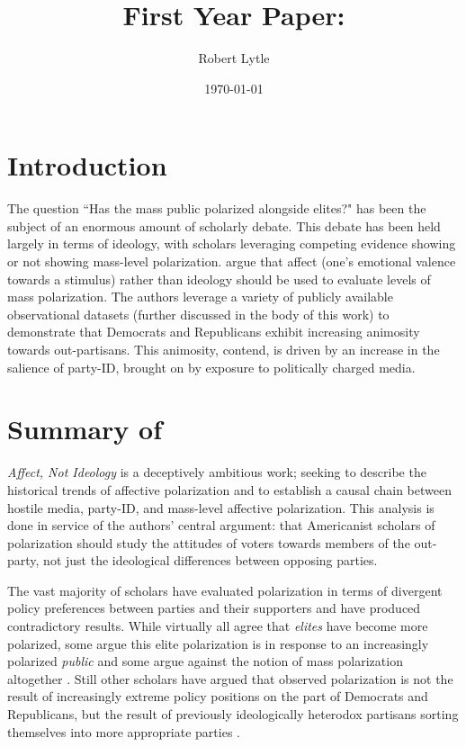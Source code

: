 \documentclass[12pt]{article}
\begin{document}
\title{First Year Paper:\\ \large{\citet{iyengar2012affect}}}
\author{Robert Lytle}
\date{\today}
\maketitle
\thispagestyle{empty}
\clearpage
\section{Introduction}
The question ``Has the mass public polarized alongside elites?" has been the subject of an enormous amount of scholarly debate. This debate has been held largely in terms of ideology, with scholars leveraging competing evidence showing \citep{abramowitz2010disappearing} or not showing \citep{fiorina2012disconnect} mass-level polarization. \cite{iyengar2012affect} argue that affect (one's emotional valence towards a stimulus) rather than ideology should be used to evaluate levels of mass polarization. The authors leverage a variety of publicly available observational datasets
 (further discussed in the body of this work) to demonstrate that Democrats and Republicans exhibit increasing animosity towards out-partisans. This animosity, \cite{iyengar2012affect} contend, is driven by an increase in the salience of party-ID, brought on by exposure to politically charged media.


\section{Summary of \cite{iyengar2012affect}}
\textit{Affect, Not Ideology} is a deceptively ambitious work; seeking to describe the historical trends of affective polarization and to establish a causal chain between hostile media, party-ID, and mass-level affective polarization. This analysis is done in service of the authors' central argument: that Americanist scholars of polarization should study the attitudes of voters towards members of the out-party, not just the ideological differences between opposing parties.

The vast majority of scholars have evaluated polarization in terms of divergent policy preferences between parties and their supporters and have produced contradictory results. While virtually all agree that \textit{elites} have become more polarized, some argue this elite polarization is in response to an increasingly polarized \textit{public} \citep{abramowitz2010disappearing} and some argue against the notion of mass polarization altogether \citep{fiorina2012disconnect, fiorina2005culture}. Still other scholars have argued that observed polarization is not the result of increasingly extreme policy positions on the part of Democrats and Republicans, but the result of previously ideologically heterodox partisans sorting themselves into more appropriate parties \citep{levendusky2009partisan}.
\end{document}
